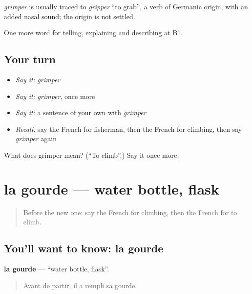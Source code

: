 \begin{cousinweb}
\emph{grimper} is usually traced to \emph{gripper} \textquotedblleft{}to grab\textquotedblright{}, a verb of Germanic origin, with an added nasal sound; the origin is not settled.
\end{cousinweb}

\begin{grammarlens}[title={What you've built}]
One more word for telling, explaining and describing at B1.
\end{grammarlens}

\subsection*{Your turn}
\begin{itemize}
\raggedright
  \item \emph{Say it:} \emph{grimper}
  \item \emph{Say it:} \emph{grimper}, once more
  \item \emph{Say it:} a sentence of your own with \emph{grimper}
  \item \emph{Recall:} say the French for fisherman, then the French for climbing, then say \emph{grimper} again
\end{itemize}

\begin{tcolorbox}[breakable,colback=teal!4,colframe=teal!35!black,title={Before you move on}]
What does grimper mean? (\textquotedblleft{}To climb\textquotedblright{}.) Say it once more.
\end{tcolorbox}
\section[la gourde]{la gourde — water bottle, flask}

\label{lesson:FR-C498-gourde}



\begin{quote}
Before the new one: say the French for climbing, then the French for to climb.
\end{quote}

\subsection*{You'll want to know: la gourde}
\textbf{la gourde} — \textquotedblleft{}water bottle, flask\textquotedblright{}.

\begin{quote}
Avant de partir, il a rempli sa gourde.
\end{quote}

